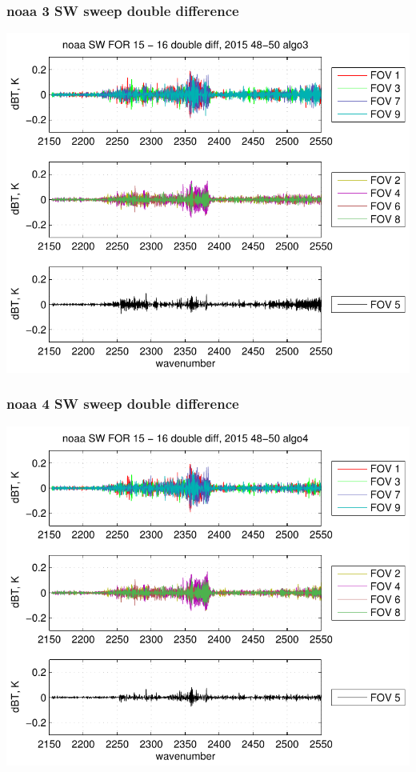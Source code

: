 \documentclass[11pt]{beamer}
\begin{document}
\begin{frame}
\frametitle{noaa 3 SW sweep double difference}
\begin{center}
  \includegraphics[scale=0.7]{figures/noaa_SW_sfil_2015_48-50_algo3.pdf}
\end{center}
\end{frame}
\begin{frame}
\frametitle{noaa 4 SW sweep double difference}
\begin{center}
  \includegraphics[scale=0.7]{figures/noaa_SW_sfil_2015_48-50_algo4.pdf}
\end{center}
\end{frame}
\end{document}
